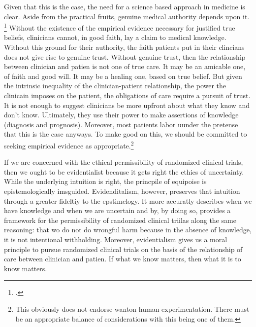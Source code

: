 \documentclass[letterpaper,notitlepage,12pt]{article}
\begin{document}
Given that this is the case, the need for a science based approach in medicine
is clear.
Aside from the practical fruits, genuine medical authority depends upon it.
\footcite[p. 354]{clifford_ethics_1886}
Without the existence of the empirical evidence necessary for justified true
beliefs, clinicians cannot, in good faith, lay a claim to medical knowledge.
Without this ground for their authority, the faith patients put in their
clincians does not give rise to genuine trust.
Without genuine trust, then the relationship between clinician and patien is not
one of true care.
It may be an amicable one, of faith and good will.
It may be a healing one, based on true belief.
But given the intrinsic inequality of the clinician-patient relationship, the
power the clinicain imposes on the patient, the obligations of care require a
pursuit of trust.
It is not enough to suggest clinicians be more upfront about what they know and
don't know.
Ultimately, they use their power to make assertions of knowledge (diagnosis and
  prognosis).
Moreover, most patients labor uunder the pretense that this is the case anyways.
To make good on this, we should be committed to seeking empirical evidence as
appropriate.\footnote{This obviously does not endorse wanton human
  experimentation. There must be an appropriate balance of considerations with
this being one of them.}

If we are concerned with the ethical permissibility of randomized clinical
trials, then we ought to be evidentialist because it gets right the ethics of
uncertainty.
While the underlying intuition is right, the princpile of equipoise is
epistemologically imsguided.
Evidenditalism, however, preserves that intuition through a greater fideltiy to
the epstimelogy.
It more accuratly describes when we have knowledge and when we are uncertain and
by, by doing so, provides a framework for the permissibility of randomized
clinical triilas along the same reasoning: that wo do not do wrongful harm
because in the absence of knowledge, it is not intentional withholding.
Moreover, evidentialism gives us a moral principle to pursue randomized clinical
trials on the basis of the relationship of care between clinician and patien.
If what we know matters, then what it is to know matters.

\printbibliography
\end{document}
